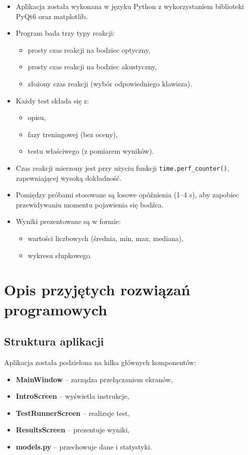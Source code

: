 \documentclass[12pt,a4paper]{article}
\begin{document}
\begin{itemize}
    \item Aplikacja została wykonana w języku Python z wykorzystaniem biblioteki PyQt6 oraz matplotlib.
    \item Program bada trzy typy reakcji:
    \begin{itemize}
        \item prosty czas reakcji na bodziec optyczny,
        \item prosty czas reakcji na bodziec akustyczny,
        \item złożony czas reakcji (wybór odpowiedniego klawisza).
    \end{itemize}
    \item Każdy test składa się z:
    \begin{itemize}
        \item opisu,
        \item fazy treningowej (bez oceny),
        \item testu właściwego (z pomiarem wyników).
    \end{itemize}
    \item Czas reakcji mierzony jest przy użyciu funkcji \texttt{time.perf\_counter()}, zapewniającej wysoką dokładność.
    \item Pomiędzy próbami stosowane są losowe opóźnienia (1–4 s), aby zapobiec przewidywaniu momentu pojawienia się bodźca.
    \item Wyniki prezentowane są w formie:
    \begin{itemize}
        \item wartości liczbowych (średnia, min, max, mediana),
        \item wykresu słupkowego.
    \end{itemize}
\end{itemize}

\section{Opis przyjętych rozwiązań programowych}

\subsection{Struktura aplikacji}

Aplikacja została podzielona na kilka głównych komponentów:

\begin{itemize}
    \item \textbf{MainWindow} – zarządza przełączaniem ekranów,
    \item \textbf{IntroScreen} – wyświetla instrukcje,
    \item \textbf{TestRunnerScreen} – realizuje test,
    \item \textbf{ResultsScreen} – prezentuje wyniki,
    \item \textbf{models.py} – przechowuje dane i statystyki.
\end{itemize}
\end{document}
